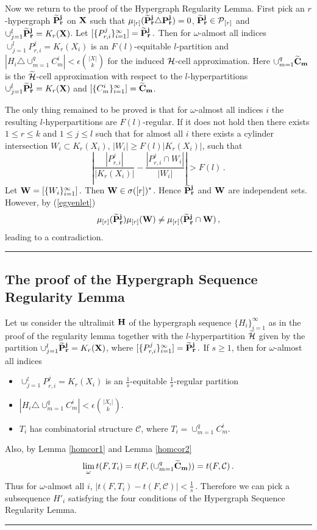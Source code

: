 \documentclass [11pt] {article}
\newcommand{\qed} {\hspace {0.1in} \rule {1.5mm} {3.5mm}}
\def\e{\epsilon}
\def\limo{\lim_{\omega}}
\def\bH{{\bf H}}
\def\cH{\mbox{$\cal H$}}
\def\cP{\mbox{$\cal P$}}
\def\xo{{\bf X}}
\def\wch{\widetilde{\cH}}
\def\wp{\widetilde{P}}
\begin{document}
\vskip 0.2in

\noindent Now we return to the proof of the Hypergraph Regularity
Lemma. First pick an $r$-hypergraph ${\bf \wp^j_r}$ on $\xo$ such
that $\mu_{[r]}({\bf \wp^j_r}\triangle{\bf  P^j_r})=0$, ${\bf
\wp^j_r}\in \cP_{[r]}$ and $\cup_{j=1}^l {\bf \wp^j_r}=K_r(\xo)$.
Let $[\{P^j_{r,i}\}^\infty_{i=1}]={\bf \wp^j_r}\,.$ Then for
$\omega$-almost all indices $\cup_{j=1}^l P^j_{r,i}= K_r(X_i)$ is an
$F(l)$-equitable $l$-partition and $|H_i\triangle \cup^q_{m=1}
C^i_m|<\e{{|X|}\choose{k}}$ for the induced $\cH$-cell approximation. Here
$\cup^q_{m=1} {\bf\widetilde{C}_m}$ is the $\wch$-cell approximation
with respect to the $l$-hyperpartitions $\cup^l_{j=1} {\bf
\wp^j_r}=K_r(\xo)$ and $[\{C^i_m\}^\infty_{i=1}]={\bf
\widetilde{C}_m}$.

\noindent The only thing remained to be proved is that for
$\omega$-almost all indices $i$ the resulting $l$-hyperpartitions
are $F(l)$-regular. If it does not hold then there exists $1\leq r
\leq k$ and $1\leq j \leq l$ such that for almost all $i$ there
exists a cylinder intersection $W_i\subset K_r(X_i)$, $|W_i|\geq
 F(l)|K_r(X_i)|$, such that
\begin{equation} \label{egyenlet}
\left|\frac{|P^j_{r,i}|}{|K_r(X_i)|}-\frac{|P^j_{r,i}\cap W_i|}
{|W_i|}\right|>F(l)\,.
\end{equation}
Let ${\bf W }=[\{W_i\}^\infty_{i=1}]\,.$ Then ${\bf W}\in
\sigma([r])^*$. Hence ${\bf \wp^j_r}$ and ${\bf
W}$ are independent sets. However, by (\ref{egyenlet})
$$\mu_{[r]}({\bf \wp^j_r})\mu_{[r]}({\bf W})\neq \mu_{[r]}({\bf \wp^j_r}
\cap {\bf W})\,,$$ leading to a contradiction. \qed

\subsection{The proof of the Hypergraph Sequence Regularity Lemma}
Let us consider the ultralimit $\bH$ of the hypergraph sequence
$\{H_i\}^\infty_{i=1}$ as in the proof of the regularity lemma
together with the $l$-hyperpartition $\wch$ given by the partition
$\cup^l_{j=1} {\bf\wp^j_r}=K_r(\xo)$, where 
$[\{P^j_{r,i}\}^\infty_{i=1}]={\bf \wp^j_r}\,.$
If $s\geq 1$, then for $\omega$-almost all indices
\begin{itemize}
\item $\cup_{j=1}^l P^j_{r,i}= K_r(X_i)$ is an $\frac{1}{s}$-equitable
$\frac{1}{s}$-regular partition
\item $|H_i\triangle \cup^q_{m=1}
C^i_m|<\e {{|X_i|}\choose{k}}$.
\item $T_i$ has combinatorial structure $\mathcal{C}$, where
$T_i=\cup^q_{m=1} C^i_m$.
\end{itemize}
Also, by Lemma \ref{homcor1} and Lemma \ref{homcor2}
$$\limo t(F,T_i)=t(F,(\cup^q_{m=1}
{\bf\widetilde{C}_m}))=t(F,\mathcal{C})\,.$$
Thus for $\omega$-almost all $i$, $|t(F,T_i)-t(F,\mathcal{C})|<\frac{1}{s}\,.$
Therefore we can pick a subsequence $H'_i$ satisfying the four conditions
of the Hypergraph Sequence Regularity Lemma. \qed
\end{document}
